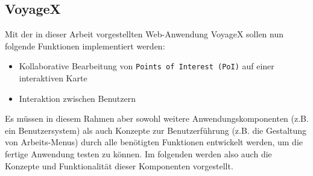 \subsection{VoyageX}\label{2_VOYAGEX}
Mit der in dieser Arbeit vorgestellten Web-Anwendung VoyageX sollen nun folgende Funktionen implementiert werden:
\begin{itemize}
  \item Kollaborative Bearbeitung von \texttt{Points of Interest (PoI)} auf einer interaktiven Karte
  \item Interaktion zwischen Benutzern
\end{itemize}
Es müssen in diesem Rahmen aber sowohl weitere Anwendungskomponenten (z.B. ein Benutzersystem) als auch Konzepte zur Benutzerführung (z.B. die Gestaltung von Arbeits-Menus) durch alle benötigten Funktionen entwickelt werden, um die fertige Anwendung testen zu können. Im folgenden werden also auch die Konzepte und Funktionalität dieser Komponenten vorgestellt.
